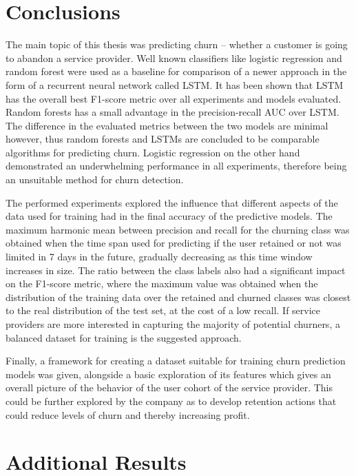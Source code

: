 \documentclass{kththesis}
\begin{document}
\chapter{Conclusions}
\label{cha:conclusion}

The main topic of this thesis was predicting churn -- whether a customer is going to abandon a service provider. Well known classifiers like logistic regression and random forest were used as a baseline for comparison of a newer approach in the form of a recurrent neural network called LSTM. It has been shown that LSTM has the overall best F1-score metric over all experiments and models evaluated. Random forests has a small advantage in the precision-recall AUC over LSTM. The difference in the evaluated metrics between the two models are minimal however, thus random forests and LSTMs are concluded to be comparable algorithms for predicting churn. Logistic regression on the other hand demonstrated an underwhelming performance in all experiments, therefore being an unsuitable method for churn detection. 

The performed experiments explored the influence that different aspects of the data used for training had in the final accuracy of the predictive models. The maximum harmonic mean between precision and recall for the churning class was obtained when the time span used for predicting if the user retained or not was limited in 7 days in the future, gradually decreasing as this time window increases in size. The ratio between the class labels also had a significant impact on the F1-score metric, where the maximum value was obtained when the distribution of the training data over the retained and churned classes was closest to the real distribution of the test set, at the cost of a low recall. If service providers are more interested in capturing the majority of potential churners, a balanced dataset for training is the suggested approach.

Finally, a framework for creating a dataset suitable for training churn prediction models was given, alongside a basic exploration of its features which gives an overall picture of the behavior of the user cohort of the service provider. This could be further explored by the company as to develop retention actions that could reduce levels of churn and thereby increasing profit.  



\appendix

\chapter{Additional Results}
\label{cha:add_results}
\end{document}
